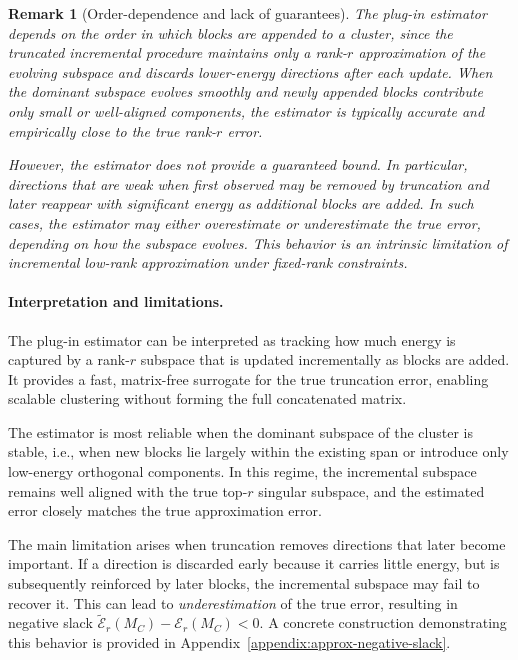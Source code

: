 \documentclass[10pt]{article} %
\newtheorem{remark}{Remark}
\begin{document}
\begin{remark}[Order-dependence and lack of guarantees]
The plug-in estimator depends on the order in which blocks are appended to a
cluster, since the truncated incremental procedure maintains only a rank-$r$
approximation of the evolving subspace and discards lower-energy directions
after each update. When the dominant subspace evolves smoothly and newly
appended blocks contribute only small or well-aligned components, the estimator
is typically accurate and empirically close to the true rank-$r$ error.

However, the estimator does not provide a guaranteed bound. In particular,
directions that are weak when first observed may be removed by truncation and
later reappear with significant energy as additional blocks are added. In such
cases, the estimator may either overestimate or underestimate the true error,
depending on how the subspace evolves. This behavior is an intrinsic limitation
of incremental low-rank approximation under fixed-rank constraints.
\end{remark}

\paragraph{Interpretation and limitations.}
The plug-in estimator can be interpreted as tracking how much energy is
captured by a rank-$r$ subspace that is updated incrementally as blocks are
added. It provides a fast, matrix-free surrogate for the true truncation error,
enabling scalable clustering without forming the full concatenated matrix.

The estimator is most reliable when the dominant subspace of the cluster is
stable, i.e., when new blocks lie largely within the existing span or introduce
only low-energy orthogonal components. In this regime, the incremental subspace
remains well aligned with the true top-$r$ singular subspace, and the estimated
error closely matches the true approximation error.

The main limitation arises when truncation removes directions that later become
important. If a direction is discarded early because it carries little energy,
but is subsequently reinforced by later blocks, the incremental subspace may
fail to recover it. This can lead to \emph{underestimation} of the true error,
resulting in negative slack
$\widetilde{\mathcal{E}}_r(M_C) - \mathcal{E}_r(M_C) < 0$.
A concrete construction demonstrating this behavior is provided in
Appendix~\ref{appendix:approx-negative-slack}.
\end{document}
